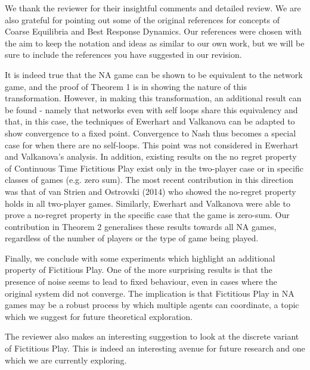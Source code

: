 \documentclass{article}
\begin{document}
	We thank the reviewer for their insightful comments and detailed review. We are also grateful for pointing out some of the original references for concepts of Coarse Equilibria and Best Response Dynamics. Our references were chosen with the aim to keep the notation and ideas as similar to our own work, but we will be sure to include the references you have suggested in our revision.
	
	It is indeed true that the NA game can be shown to be equivalent to the network game, and the proof of Theorem 1 is in showing the nature of this transformation. However, in making this transformation, an additional result can be found - namely that networks even with self loops share this equivalency and that, in this case, the techniques of Ewerhart and Valkanova can be adapted to show convergence to a fixed point. Convergence to Nash thus becomes a special case for when there are no self-loops. This point was not considered in Ewerhart and Valkanova's analysis. In addition, existing results on the no regret property of Continuous Time Fictitious Play exist only in the two-player case or in specific classes of games (e.g. zero sum). The most recent contribution in this direction was that of van Strien and Ostrovski (2014) who showed the no-regret property holds in all two-player games. Similarly, Ewerhart and Valkanova were able to prove a no-regret property in the specific case that the game is zero-sum. Our contribution in Theorem 2 generalises these results towards all NA games, regardless of the number of players or the type of game being played. 
	
	Finally, we conclude with some experiments which highlight an additional property of Fictitious Play. One of the more surprising results is that the presence of noise seems to lead to fixed behaviour, even in cases where the original system did not converge. The implication is that Fictitious Play in NA games may be a robust process by which multiple agents can coordinate, a topic which we suggest for future theoretical exploration.
	
	The reviewer also makes an interesting suggestion to look at the discrete variant of Fictitious Play. This is indeed an interesting avenue for future research and one which we are currently exploring. 
	
\end{document}
